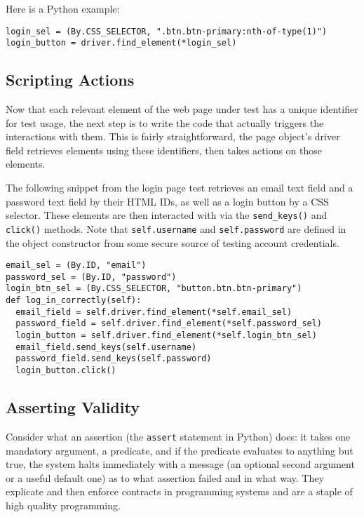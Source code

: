 Here is a Python example:
\begin{Verbatim}[fontsize=\small, baselinestretch=0.75]
login_sel = (By.CSS_SELECTOR, ".btn.btn-primary:nth-of-type(1)")
login_button = driver.find_element(*login_sel)
\end{Verbatim}

\subsection{Scripting Actions}
Now that each relevant element of the web page under test has a unique identifier for test usage, the next step is to write the code that actually triggers the interactions with them. This is fairly straightforward, the page object's driver field retrieves elements using these identifiers, then takes actions on those elements.

The following snippet from the login page test retrieves an email text field and a password text field by their HTML IDs, as well as a login button by a CSS selector. These elements are then interacted with via the \texttt{send\_keys()} and \texttt{click()} methods. Note that \texttt{self.username} and \texttt{self.password} are defined in the object constructor from some secure source of testing account credentials.

\begin{Verbatim}[fontsize=\small, baselinestretch=0.75]
email_sel = (By.ID, "email")
password_sel = (By.ID, "password")
login_btn_sel = (By.CSS_SELECTOR, "button.btn.btn-primary")
def log_in_correctly(self):
  email_field = self.driver.find_element(*self.email_sel)
  password_field = self.driver.find_element(*self.password_sel)
  login_button = self.driver.find_element(*self.login_btn_sel)
  email_field.send_keys(self.username)
  password_field.send_keys(self.password)
  login_button.click()
\end{Verbatim}

\subsection{Asserting Validity}
Consider what an assertion (the \texttt{assert} statement in Python) does: it takes one mandatory argument, a predicate, and if the predicate evaluates to anything but true, the system halts immediately with a message (an optional second argument or a useful default one) as to what assertion failed and in what way. They explicate and then enforce contracts in programming systems and are a staple of high quality programming.


